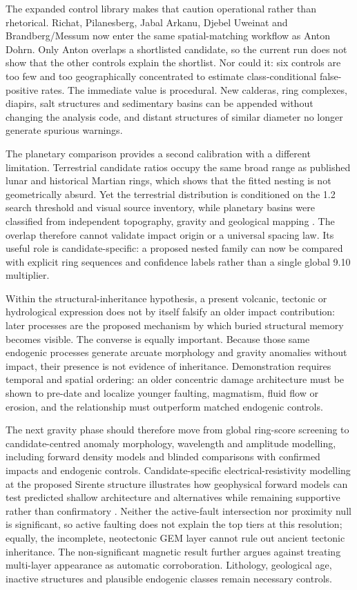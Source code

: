 \documentclass[11pt]{article}
\begin{document}
The expanded control library makes that caution operational rather than rhetorical. Richat, Pilanesberg, Jabal Arkanu, Djebel Uweinat and Brandberg/Messum now enter the same spatial-matching workflow as Anton Dohrn. Only Anton overlaps a shortlisted candidate, so the current run does not show that the other controls explain the shortlist. Nor could it: six controls are too few and too geographically concentrated to estimate class-conditional false-positive rates. The immediate value is procedural. New calderas, ring complexes, diapirs, salt structures and sedimentary basins can be appended without changing the analysis code, and distant structures of similar diameter no longer generate spurious warnings.

The planetary comparison provides a second calibration with a different limitation. Terrestrial candidate ratios occupy the same broad range as published lunar and historical Martian rings, which shows that the fitted nesting is not geometrically absurd. Yet the terrestrial distribution is conditioned on the 1.2 search threshold and visual source inventory, while planetary basins were classified from independent topography, gravity and geological mapping \cite{Neumann2015,PikeSpudis1987}. The overlap therefore cannot validate impact origin or a universal spacing law. Its useful role is candidate-specific: a proposed nested family can now be compared with explicit ring sequences and confidence labels rather than a single global 9.10 multiplier.

Within the structural-inheritance hypothesis, a present volcanic, tectonic or hydrological expression does not by itself falsify an older impact contribution: later processes are the proposed mechanism by which buried structural memory becomes visible. The converse is equally important. Because those same endogenic processes generate arcuate morphology and gravity anomalies without impact, their presence is not evidence of inheritance. Demonstration requires temporal and spatial ordering: an older concentric damage architecture must be shown to pre-date and localize younger faulting, magmatism, fluid flow or erosion, and the relationship must outperform matched endogenic controls.

The next gravity phase should therefore move from global ring-score screening to candidate-centred anomaly morphology, wavelength and amplitude modelling, including forward density models and blinded comparisons with confirmed impacts and endogenic controls. Candidate-specific electrical-resistivity modelling at the proposed Sirente structure illustrates how geophysical forward models can test predicted shallow architecture and alternatives while remaining supportive rather than confirmatory \cite{Torrese2022}. Neither the active-fault intersection nor proximity null is significant, so active faulting does not explain the top tiers at this resolution; equally, the incomplete, neotectonic GEM layer cannot rule out ancient tectonic inheritance. The non-significant magnetic result further argues against treating multi-layer appearance as automatic corroboration. Lithology, geological age, inactive structures and plausible endogenic classes remain necessary controls.
\end{document}
